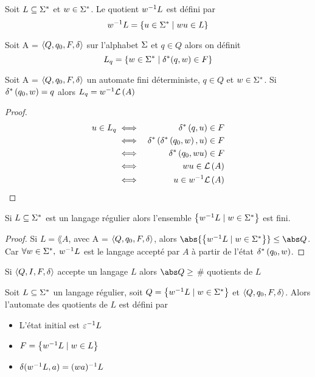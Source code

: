 \begin{definition}
	Soit $L \subseteq \Sigma^{*}$ et $w \in \Sigma^{*}$. Le quotient $w^{-1} L$ est défini par
	$$ w^{-1} L = \left\{u \in \Sigma^{*} \mid wu \in L\right\} $$
\end{definition}

\begin{definition}
	Soit A = $\langle Q, q_0, F, \delta \rangle$ sur l'alphabet $\Sigma$ et $q \in Q$ alors on définit
	$$ L_q = \left\{w \in \Sigma^{*} \mid \delta^{*} (q,w) \in F\right\} $$
\end{definition}


\begin{lemma}
	Soit A = $\langle Q, q_0, F, \delta \rangle$ un automate fini déterministe, $q \in Q$ et $w \in \Sigma^{*}$. Si $\delta^{*} \left(q_0,w\right) = q$ alors
	$L_q = w^{-1} \mathcal{L}\left(A\right)$
\end{lemma}

\begin{proof}
	\begin{eqnarray*}
		u \in L_q &\iff& \delta^{*} \left(q,u\right) \in F \\
		&\iff& \delta^{*} \left(\delta^{*} \left(q_0,w\right),u\right) \in F \\
		&\iff& \delta^{*} \left(q_0,wu\right) \in F \\
		&\iff& wu \in \mathcal{L}\left(A\right) \\
		&\iff& u \in w^{-1} \mathcal{L}\left(A\right)
	\end{eqnarray*}
\end{proof}

\begin{coro}
	Si $L \subseteq \Sigma^{*}$ est un langage régulier alors l'ensemble $\left\{w^{-1} L \mid w \in \Sigma^{*}\right\}$ est fini.
\end{coro}

\begin{proof}
	Si $L = \lang A$, avec A = $\langle Q, q_0, F, \delta \rangle$, alors $\abs {\setdef {\quot w L} {w \in \mots}} \leq \abs Q$. Car $\forall w \in \Sigma^{*},$ $w^{-1} L$ est
	le langage accepté par $A$ à partir de l'état $\delta^{*} \left(q_0,w\right)$.
\end{proof}

\begin{coro} \label{coro:2}
	Si $\langle Q, I, F, \delta \rangle$ accepte un langage $L$ alors $\abs Q \geq $ \# quotients de $L$
\end{coro}

\begin{definition} 

	Soit $L \subseteq \Sigma^{*}$ un langage régulier, soit $Q = \left\{w^{-1} L \mid w \in \Sigma^{*}\right\}$ et $\langle Q, q_0, F, \delta \rangle$. Alors l'automate des quotients de $L$
	est défini par

	\begin{itemize}
		\item L'état initial est $\varepsilon^{-1} L$
		\item $F = \left\{w^{-1} L \mid w \in L\right\}$
		\item $\delta (w^{-1} L, a) = (wa)^{-1} L$
	\end{itemize}
\end{definition}

